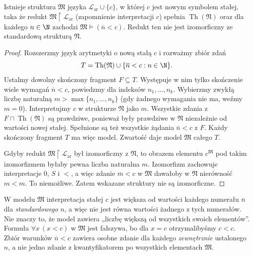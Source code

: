 \begin{twierdzenie}\label{thm:compactness-nonstandard}
Istnieje struktura $\mathfrak M$ języka $\mathcal L_{\mathrm{ar}}\cup\{c\}$,
w której $c$ jest nowym symbolem stałej, taka że
redukt $\mathfrak M\upharpoonright\mathcal L_{\mathrm{ar}}$
(zapomnienie interpretacji $c$) spełnia
$\operatorname{Th}(\mathfrak N)$ oraz dla każdego $n\in\N$
zachodzi $\mathfrak M\models(\overline n<c)$.
Redukt ten nie jest izomorficzny ze standardową strukturą $\mathfrak N$.
\end{twierdzenie}
\begin{proof}
Rozszerzmy język arytmetyki o nową stałą $c$ i rozważmy zbiór zdań
\[
T=\operatorname{Th}(\mathfrak N)\cup\{\overline n<c:n\in\N\}.
\]
Ustalmy dowolny skończony fragment $F\subseteq T$. Występuje w nim tylko skończenie wiele wymagań $\overline n<c$, powiedzmy dla indeksów $n_1,\ldots,n_k$. Wybierzmy zwykłą liczbę naturalną $m>\max\{n_1,\ldots,n_k\}$ (gdy żadnego wymagania nie ma, weźmy $m=0$). Interpretujmy $c$ w strukturze $\mathfrak N$ jako $m$. Wszystkie zdania z $F\cap\operatorname{Th}(\mathfrak N)$ są prawdziwe, ponieważ były prawdziwe w $\mathfrak N$ niezależnie od wartości nowej stałej. Spełnione są też wszystkie żądania $\overline n<c$ z $F$. Każdy skończony fragment $T$ ma więc model. Zwartość daje model $\mathfrak M$ całego $T$.

Gdyby redukt $\mathfrak M\upharpoonright\mathcal L_{\mathrm{ar}}$
był izomorficzny z $\mathfrak N$, to obrazem elementu
$c^{\mathfrak M}$ pod takim izomorfizmem byłaby pewna liczba naturalna $m$.
Izomorfizm zachowuje interpretacje $0$, $S$ i $<$,
a więc zdanie $\overline m<c$ w $\mathfrak M$ dawałoby
w $\mathfrak N$ nierówność $m<m$. To niemożliwe.
Zatem wskazane struktury nie są izomorficzne.
\end{proof}

\begin{uwaga}
W modelu $\mathfrak M$ interpretacja stałej $c$ jest większa od wartości każdego numerału $\overline n$ dla \emph{standardowego} $n$, a więc nie jest równa wartości żadnego z tych numerałów. Nie znaczy to, że model zawiera „liczbę większą od wszystkich swoich elementów”. Formuła $\forall x\,(x<c)$ w $\mathfrak M$ jest fałszywa, bo dla $x=c$ otrzymalibyśmy $c<c$. Zbiór warunków $\overline n<c$ zawiera osobne zdanie dla każdego \emph{zewnętrznie} ustalonego $n$, a nie jedno zdanie z kwantyfikatorem po wszystkich elementach $\mathfrak M$.
\end{uwaga}

